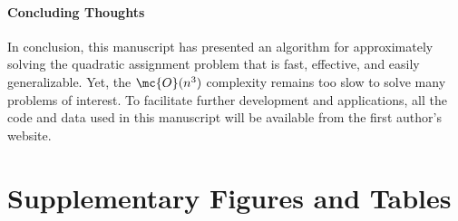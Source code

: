 \documentclass{article} %
\begin{document}
\vspace{-5pt}
\paragraph{Concluding Thoughts}

In conclusion, this manuscript has presented an algorithm for approximately solving the quadratic assignment problem that is fast, effective, and easily generalizable.  Yet, the $\mc{O}(n^3)$ complexity remains too slow to solve many problems of interest.  To facilitate further development and applications, all the code and data used in this manuscript will be available from the first author's website.

% 
\clearpage
{\small


}

\clearpage
\appendix
\clearpage
\section{Supplementary Figures and Tables}

\end{document}
